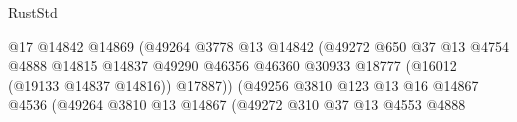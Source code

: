 \begin{lexlean}{RustStd}
\begin{coremodule}
                                                          @17
                                                          @14842
                                                          @14869
                                                          (@49264
                                                            @3778
                                                            @13
                                                            @14842
                                                            (@49272
                                                              @650
                                                              @37
                                                              @13
                                                              @4754
                                                              @4888
                                                              @14815
                                                              @14837
                                                              @49290
                                                              @46356
                                                              @46360
                                                              @30933
                                                              @18777
                                                              (@16012 (@19133 @14837 @14816))
                                                              @17887))
                                                          (@49256
                                                            @3810
                                                            @123
                                                            @13
                                                            @16
                                                            @14867
                                                            @4536
                                                            (@49264
                                                              @3810
                                                              @13
                                                              @14867
                                                              (@49272
                                                                @310
                                                                @37
                                                                @13
                                                                @4553
                                                                @4888

\end{coremodule}
\end{lexlean}
